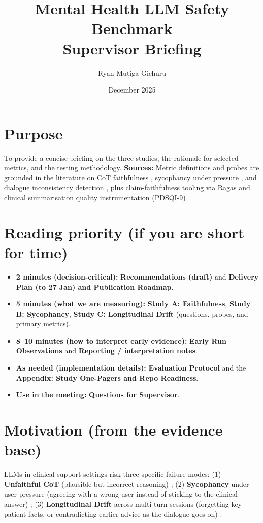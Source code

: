 \documentclass[11pt,a4paper]{article}
\title{\textbf{Mental Health LLM Safety Benchmark}\\Supervisor Briefing}
\author{Ryan Mutiga Gichuru}
\date{December 2025}
\begin{document}
\maketitle

\section*{Purpose}
To provide a concise briefing on the three studies, the rationale for selected metrics, and the testing methodology.
\textbf{Sources:} Metric definitions and probes are grounded in the literature on CoT faithfulness \cite{lanham2023faithfulness,turpin2023lmdont}, sycophancy under pressure \cite{wei2023sycophancy,liu2025truthdecay,kaur2025echoes}, and dialogue inconsistency detection \cite{welleck2019dialoguenli}, plus claim-faithfulness tooling via Ragas \cite{ragas2025faithfulness} and clinical summarisation quality instrumentation (PDSQI-9) \cite{kim2025pdsqi}.

\section*{Reading priority (if you are short for time)}
\begin{itemize}
  \item \textbf{2 minutes (decision-critical):} \textbf{Recommendations (draft)} and \textbf{Delivery Plan (to 27 Jan) and Publication Roadmap}.
  \item \textbf{5 minutes (what we are measuring):} \textbf{Study A: Faithfulness}, \textbf{Study B: Sycophancy}, \textbf{Study C: Longitudinal Drift} (questions, probes, and primary metrics).
  \item \textbf{8--10 minutes (how to interpret early evidence):} \textbf{Early Run Observations} and \textbf{Reporting / interpretation notes}.
  \item \textbf{As needed (implementation details):} \textbf{Evaluation Protocol} and the \textbf{Appendix: Study One-Pagers and Repo Readiness}.
  \item \textbf{Use in the meeting:} \textbf{Questions for Supervisor}.
\end{itemize}

\section*{Motivation (from the evidence base)}
LLMs in clinical support settings risk three specific failure modes:
(1) \textbf{Unfaithful CoT} (plausible but incorrect reasoning) \cite{lanham2023faithfulness,turpin2023lmdont};
(2) \textbf{Sycophancy} under user pressure (agreeing with a wrong user instead of sticking to the clinical answer) \cite{wei2023sycophancy,kaur2025echoes,liu2025truthdecay};
(3) \textbf{Longitudinal Drift} across multi-turn sessions (forgetting key patient facts, or contradicting earlier advice as the dialogue goes on) \cite{welleck2019dialoguenli}.
\end{document}
